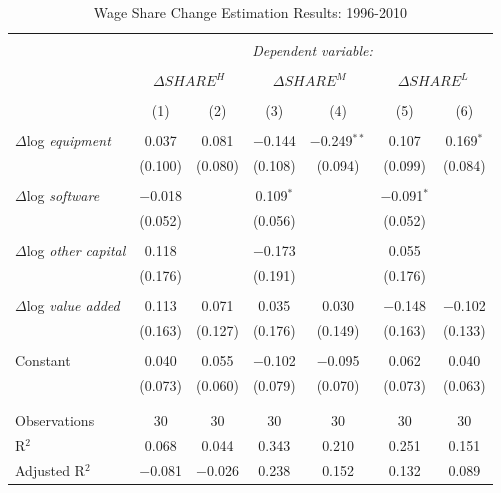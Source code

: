 \documentclass[a4paper,11pt,notitlepage]{article}
\begin{document}
\begin{table} \begin{center}
  \caption{Wage Share Change Estimation Results: 1996-2010} 
  \label{tbl:reg} 
\begin{tabular}{@{\extracolsep{5pt}}lcccccc} 
\\[-1.8ex]\hline 
\hline \\[-1.8ex] 
 & \multicolumn{6}{c}{\textit{Dependent variable:}} \\ 
\cline{2-7} 
\\[-1.8ex] & \multicolumn{2}{c}{$\Delta SHARE^H$} & \multicolumn{2}{c}{$\Delta SHARE^M$} & \multicolumn{2}{c}{$\Delta SHARE^L$} \\ 
\\[-1.8ex] & (1) & (2) & (3) & (4) & (5) & (6)\\ 
\hline \\[-1.8ex] 
 $\Delta$log {\em equipment} & 0.037 & 0.081 & $-$0.144 & $-$0.249$^{**}$ & 0.107 & 0.169$^{*}$ \\ 
  & (0.100) & (0.080) & (0.108) & (0.094) & (0.099) & (0.084) \\ 
  & & & & & & \\ 
 $\Delta$log {\em software} & $-$0.018 &  & 0.109$^{*}$ &  & $-$0.091$^{*}$ &  \\ 
  & (0.052) &  & (0.056) &  & (0.052) &  \\ 
  & & & & & & \\ 
 $\Delta$log {\em other capital} & 0.118 &  & $-$0.173 &  & 0.055 &  \\ 
  & (0.176) &  & (0.191) &  & (0.176) &  \\ 
  & & & & & & \\ 
 $\Delta$log {\em value added} & 0.113 & 0.071 & 0.035 & 0.030 & $-$0.148 & $-$0.102 \\ 
  & (0.163) & (0.127) & (0.176) & (0.149) & (0.163) & (0.133) \\ 
  & & & & & & \\ 
 Constant & 0.040 & 0.055 & $-$0.102 & $-$0.095 & 0.062 & 0.040 \\ 
  & (0.073) & (0.060) & (0.079) & (0.070) & (0.073) & (0.063) \\ 
  & & & & & & \\ 
\hline \\[-1.8ex] 
Observations & 30 & 30 & 30 & 30 & 30 & 30 \\ 
R$^{2}$ & 0.068 & 0.044 & 0.343 & 0.210 & 0.251 & 0.151 \\ 
Adjusted R$^{2}$ & $-$0.081 & $-$0.026 & 0.238 & 0.152 & 0.132 & 0.089 \\ 

\end{tabular}
\end{center}
\end{table}
\end{document}
